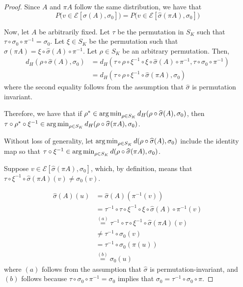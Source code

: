 \documentclass{article}
\begin{document}
\begin{proof}

Since $A$ and $\pi A$ follow the same distribution, we have that
\[
P \Big(v \in \mathcal{E}[\hat{\sigma}(A), \sigma_0 ] \Big) = 
       P \Big(v \in \mathcal{E}[\hat{\sigma}(\pi A), \sigma_0] \Big) 
\]

Now, let $A$ be arbitrarily fixed. Let $\tau$ be the permutation in $S_K$ such that $\tau \circ \sigma_0 \circ \pi^{-1} = \sigma_0$. Let $\xi \in S_K$ be the permutation such that $\hat{\sigma}(\pi A) = \xi \circ \hat{\sigma}(A) \circ \pi^{-1}$. Let $\rho \in S_K$ be an arbitrary permutation. Then, 
\begin{align*}
d_H(\rho \circ \hat{\sigma}(A), \sigma_0) &= 
      d_H( \tau \circ \rho \circ \xi^{-1} \circ \xi \circ \hat{\sigma}(A) \circ \pi^{-1}, \tau \circ \sigma_0 \circ \pi^{-1} ) \\
  &= d_H( \tau \circ \rho \circ \xi^{-1} \circ \hat{\sigma}(\pi A), \sigma_0)
\end{align*}
where the second equality follows from the assumption that $\hat{\sigma}$ is permutation invariant.

Therefore, we have that if $\rho^* \in \mathop{\text{\rm arg\,min}}_{\rho \in S_K} d_H(\rho \circ \widehat{\sigma}(A), \sigma_0)$, 
then $\tau \circ \rho^* \circ \xi^{-1} \in \mathop{\text{\rm arg\,min}}_{\rho \in S_K} d_H( \rho \circ \widehat{\sigma}(\pi A), \sigma_0)$.

Without loss of generality, let $\mathop{\text{\rm arg\,min}}_{\rho \in S_K} d(\rho \circ \widehat{\sigma}(A), \sigma_0)$ include the identity map so that $\tau \circ \xi^{-1} \in \mathop{\text{\rm arg\,min}}_{\rho \in S_K} d( \rho \circ \widehat{\sigma}( \pi A), \sigma_0)$.

Suppose $v \in \mathcal{E}[\hat{\sigma}(\pi A), \sigma_0]$, which, by definition, means that $\tau \circ \xi^{-1} \circ \hat{\sigma}(\pi A)(v) \neq \sigma_0(v)$. 

\begin{align*}
\hat{\sigma}(A)(u) &= \hat{\sigma}(A)(\pi^{-1}(v)) \\
   &= \tau^{-1} \circ \tau \circ \xi^{-1} \circ \xi \circ \hat{\sigma}(A) \circ \pi^{-1} (v) \\
   &\stackrel{(a)} = \tau^{-1} \circ \tau \circ \xi^{-1} \circ \hat{\sigma}( \pi A) (v) \\
   &\neq \tau^{-1} \circ \sigma_0(v) \\
   &= \tau^{-1} \circ \sigma_0( \pi( u )) \\
   &\stackrel{(b)} = \sigma_0(u)
\end{align*}
where $(a)$ follows from the assumption that $\hat{\sigma}$ is permutation-invariant, and $(b)$ follows because $\tau \circ \sigma_0 \circ \pi^{-1} = \sigma_0$ implies that $\sigma_0 = \tau^{-1} \circ \sigma_0 \circ \pi$.


\end{proof}
\end{document}
